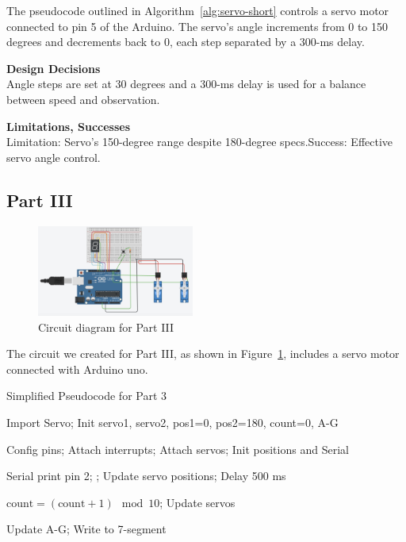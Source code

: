 \documentclass[journal]{IEEEtran}
\begin{document}
The pseudocode outlined in Algorithm~\ref{alg:servo-short} controls a servo motor connected to pin 5 of the Arduino. The servo's angle increments from 0 to 150 degrees and decrements back to 0, each step separated by a 300-ms delay.

\textbf{Design Decisions}\\
Angle steps are set at 30 degrees and a 300-ms delay is used for a balance between speed and observation.

\textbf{Limitations, Successes}\\
Limitation: Servo's 150-degree range despite 180-degree specs.Success: Effective servo angle control.

\subsection{Part III}
\begin{figure}[H]
\centering
\includegraphics[width=0.46\textwidth]{images/Part3_circuits.jpg}
\caption{Circuit diagram for Part III}
\label{fig:circuit_part3}
\end{figure}

The circuit we created for Part III, as shown in Figure~\ref{fig:circuit_part3}, includes a servo motor connected with Arduino uno.

\begin{algorithm}
\caption{Simplified Pseudocode for Part 3}\label{alg:7segment_servo}
\begin{algorithmic}[1]
\State Import Servo; Init servo1, servo2, pos1=0, pos2=180, count=0, A-G

  \State Config pins; Attach interrupts; Attach servos; Init positions and Serial
\EndProcedure

  \State Serial print pin 2; ; Update servo positions; Delay 500 ms
\EndProcedure

  \State \( \text{count} = (\text{count} + 1) \mod 10 \); Update servos
\EndProcedure

  \State Update A-G; Write to 7-segment
\EndProcedure
\end{algorithmic}
\end{algorithm}
\end{document}
